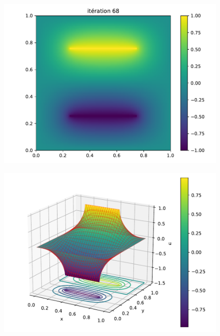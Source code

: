 \documentclass[%
oneside,                 %
final,                   %
10pt,french]{article}
\newenvironment{doconceexercise}{}{}
\begin{document}
\begin{doconceexercise}
\begin{figure}[!ht]  %
  \centerline{\includegraphics[width=1.0\linewidth]{scripts/Laplace_condensateur2D.pdf}}
  \caption{
  \label{fig:Laplace_condensateur2D}
  }
\end{figure}



\begin{figure}[!ht]  %
  \centerline{\includegraphics[width=1.0\linewidth]{scripts/Laplace_condensateur3D.pdf}}
  \caption{
  \label{fig:Laplace_condensateur3D}
  }
\end{figure}


\end{doconceexercise}



\end{document}
